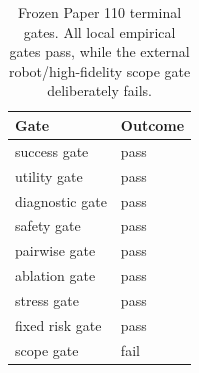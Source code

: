 \begin{table}[t]
\centering
\caption{Frozen Paper 110 terminal gates. All local empirical gates pass, while the external robot/high-fidelity scope gate deliberately fails.}
\begin{tabular}{ll}
\toprule
Gate & Outcome \\
\midrule
success gate & pass \\
utility gate & pass \\
diagnostic gate & pass \\
safety gate & pass \\
pairwise gate & pass \\
ablation gate & pass \\
stress gate & pass \\
fixed risk gate & pass \\
scope gate & fail \\
\bottomrule
\end{tabular}
\end{table}
